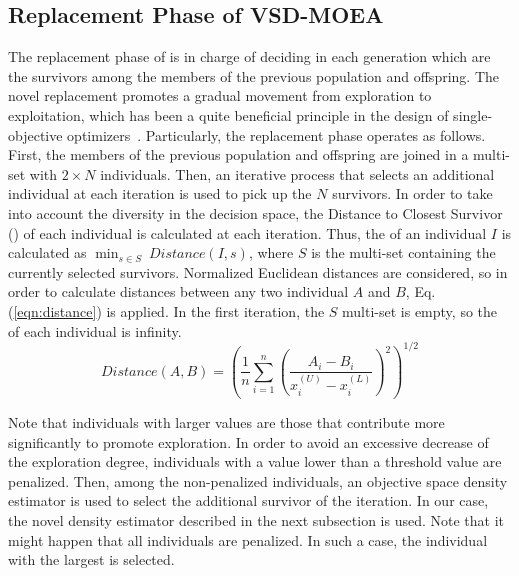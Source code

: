 \subsection{Replacement Phase of VSD-MOEA}

The replacement phase of \EAS{} is in charge of deciding in each generation which are the survivors 
among the members of the previous population and offspring.
%
The novel replacement promotes a gradual movement from exploration to exploitation, which has been a quite 
beneficial principle in the design of single-objective optimizers~\cite{Joel:MULTI_DYNAMIC}.
%
Particularly, the replacement phase operates as follows.
%
First, the members of the previous population and offspring are joined in a multi-set with $2 \times N$ individuals.
%
%
%
Then, an iterative process that selects an additional
individual at each iteration is used to pick up the $N$ survivors. 
%
In order to take into account the diversity in the decision space, the Distance to Closest Survivor (\DCS{}) of each
individual is calculated at each iteration.
%
Thus, the \DCS{} of an individual $I$ is calculated as $\displaystyle{\min_{s \in S}\ Distance(I, s)}$,
where $S$ is the multi-set containing the currently selected survivors. 
%
Normalized Euclidean distances are considered, so in order to calculate distances between any two individual $A$ and $B$, 
Eq. (\ref{eqn:distance}) is applied.
%
In the first iteration, the $S$ multi-set is empty, so the \DCS{} of each individual is infinity.
%
\begin{equation}\label{eqn:distance}
Distance(A, B) =   \left ( \frac{1}{n}  \sum_{i=1}^n \left ( \frac{A_i - B_i}{x_i^{(U)} - x_i^{(L)}} \right )^2  \right)^{1/2}
\end{equation}

Note that individuals with larger \DCS{} values are those that contribute more significantly to promote exploration.
%
In order to avoid an excessive decrease of the exploration degree, individuals with a \DCS{} value lower 
than a threshold value are penalized.
%
Then, among the non-penalized individuals, an objective space density estimator is used to select the additional
survivor of the iteration.
%
In our case, the novel density estimator described in the next subsection is used. 
%
Note that it might happen that all individuals are penalized.
%
In such a case, the individual with the largest \DCS{} is selected.

